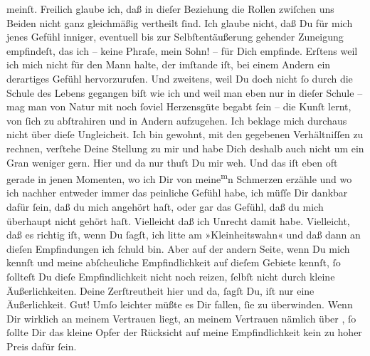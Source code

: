                meinſt. Freilich glaube ich, daß in dieſer Beziehung die Rollen zwiſchen uns Beiden
               nicht ganz gleichmäßig vertheilt{ }ſind. Ich glaube nicht, daß Du für mich jenes Gefühl
               inniger, eventuell bis zur Selbſtentäußerung gehender Zuneigung empfindeſt, das ich –
               keine Phraſe, mein Sohn! – für Dich empfinde. Erſtens weil ich mich nicht für den
               Mann halte, der imſtande iſt, bei einem Andern  ein derartiges Gefühl hervorzurufen. {\pb}Und
               zweitens, weil Du doch nicht{ }ſo durch die Schule des Lebens gegangen biſt wie ich und
               weil man eben nur in dieſer Schule – mag man von Natur mit noch{ }ſoviel Herzensgüte
               begabt{ }ſein – die Kunſt lernt, von{ }ſich zu abſtrahiren und in Andern aufzugehen. Ich
               beklage mich durchaus nicht über dieſe Ungleicheit. Ich bin gewohnt, mit den
               gegebenen Verhältniſſen zu rechnen, verſtehe Deine Stellung zu mir und habe Dich
               deshalb auch nicht um ein\strikeout{\textcolor{gray}{en}} Gran weniger {\pb}gern. Hier und da nur thuſt Du
               mir weh. Und das iſt eben oft gerade in jenen Momenten,  wo ich Dir von meine\substVorne{}\textsuperscript{m}\substDazwischen{}n\substHinten{} Schmerzen erzähle und wo ich nachher entweder immer das peinliche Gefühl
               habe, ich müſſe Dir dankbar dafür{ }ſein, daß du mich angehört haſt, oder gar das
               Gefühl, daß du mich überhaupt nicht gehört haſt. Vielleicht daß ich Unrecht damit
               habe. Vielleicht, daß es richtig iſt, wenn Du{ }ſagſt, ich litte am »Kleinheitswahn«
               und daß dann an dieſen Empfindungen ich{ }ſchuld bin. Aber auf der andern Seite, wenn
               Du mich kennſt und meine abſcheuliche Empfindlichkeit auf dieſem Gebiete kennſt,{ }ſo{ }ſollteſt Du dieſe Empfindlichkeit nicht noch reizen, ſelbſt nicht durch kleine Äußerlichkeiten. Deine Zerſtreutheit {\pb}hier und da,{ }ſagſt Du, iſt nur eine Äußerlichkeit.
               Gut! Umſo leichter müßte es Dir fallen,{ }ſie zu überwinden. Wenn Dir wirklich an
               meinem Vertrauen liegt, an meinem Vertrauen nämlich über \label{K_L02651-2v}\label{K_L02651-2},{ }ſo{ }ſollte Dir das kleine Opfer der Rücksicht auf meine
               Empfindlichkeit kein zu hoher Preis dafür{ }ſein.\pend
           
